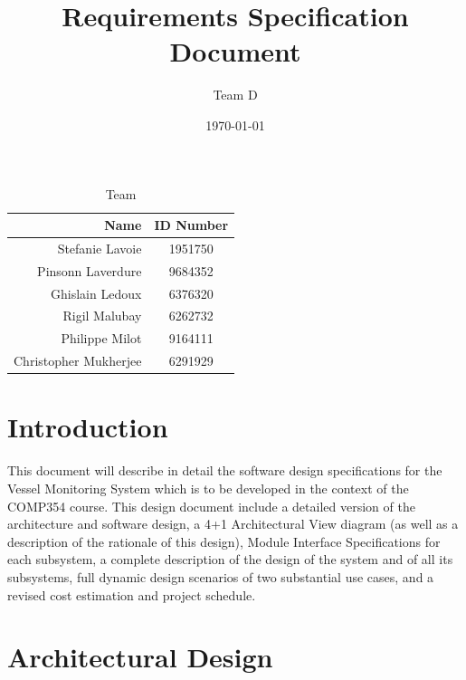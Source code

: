 \documentclass{article}
\begin{document}
\title{Requirements Specification Document}
\author{Team D}
\date{\today}

\maketitle

\vspace*{3.5in}
\begin{table}[htbp]
\caption{Team}
\begin{center}
\begin{tabular}{|r | c|}
\hline
Name & ID Number \\
\hline\hline
Stefanie Lavoie & 1951750 \\
Pinsonn Laverdure & 9684352 \\
Ghislain Ledoux & 6376320 \\
Rigil Malubay & 6262732 \\
Philippe Milot & 9164111 \\
Christopher Mukherjee & 6291929 \\
\hline
\end{tabular}
\end{center}
\end{table}

\clearpage

\tableofcontents
\clearpage


\section{Introduction} %

This document will describe in detail the software design specifications for the Vessel Monitoring System which is to be developed in the context of the COMP354 course. This design document include a detailed version of the architecture and software design, a 4+1 Architectural View diagram (as well as a description of the rationale of this design), Module Interface Specifications for each subsystem, a complete description of the design of the system and of all its subsystems, full dynamic design scenarios of two substantial use cases, and a revised cost estimation and project schedule.

\break

\section{Architectural Design} %
\end{document}
